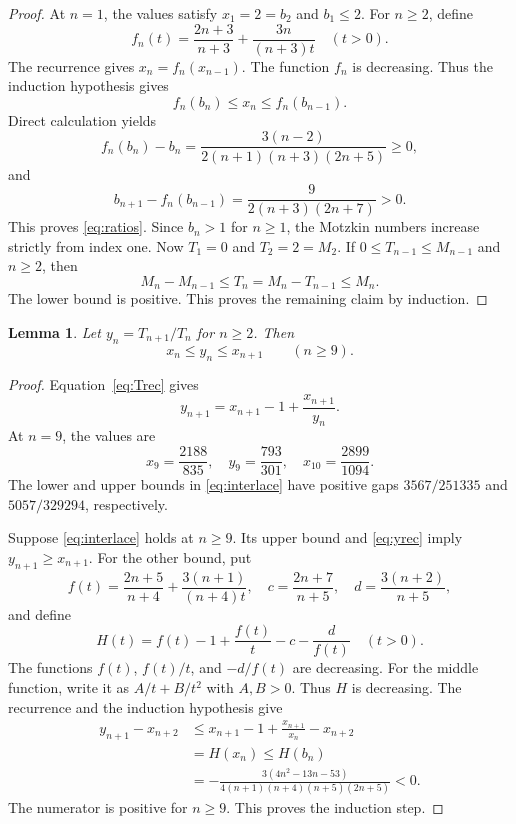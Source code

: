 \documentclass[11pt]{article}
\newtheorem{lemma}[theorem]{Lemma}
\begin{document}
\begin{proof}
At $n=1$, the values satisfy $x_1=2=b_2$ and $b_1\le2$.
For $n\ge2$, define
\[
f_n(t)=\frac{2n+3}{n+3}+\frac{3n}{(n+3)t}\quad(t>0).
\]
The recurrence gives $x_n=f_n(x_{n-1})$.
The function $f_n$ is decreasing. Thus the induction hypothesis gives
\[
f_n(b_n)\le x_n\le f_n(b_{n-1}).
\]
Direct calculation yields
\[
f_n(b_n)-b_n
=\frac{3(n-2)}{2(n+1)(n+3)(2n+5)}\ge0,
\]
and
\[
b_{n+1}-f_n(b_{n-1})
=\frac{9}{2(n+3)(2n+7)}>0.
\]
This proves \eqref{eq:ratios}.
Since $b_n>1$ for $n\ge1$, the Motzkin numbers increase strictly from
index one. Now $T_1=0$ and $T_2=2=M_2$.
If $0\le T_{n-1}\le M_{n-1}$ and $n\ge2$, then
\[
M_n-M_{n-1}\le T_n=M_n-T_{n-1}\le M_n.
\]
The lower bound is positive. This proves the remaining claim by induction.
\end{proof}

\begin{lemma}\label{lem:interlace}
Let $y_n=T_{n+1}/T_n$ for $n\ge2$. Then
\begin{equation}\label{eq:interlace}
x_n\le y_n\le x_{n+1}\qquad(n\ge9).
\end{equation}
\end{lemma}

\begin{proof}
Equation~\eqref{eq:Trec} gives
\begin{equation}\label{eq:yrec}
y_{n+1}=x_{n+1}-1+\frac{x_{n+1}}{y_n}.
\end{equation}
At $n=9$, the values are
\[
x_9=\frac{2188}{835},\quad y_9=\frac{793}{301},\quad
x_{10}=\frac{2899}{1094}.
\]
The lower and upper bounds in \eqref{eq:interlace} have positive gaps
$3567/251335$ and $5057/329294$, respectively.

Suppose \eqref{eq:interlace} holds at $n\ge9$.
Its upper bound and \eqref{eq:yrec} imply $y_{n+1}\ge x_{n+1}$.
For the other bound, put
\[
f(t)=\frac{2n+5}{n+4}+\frac{3(n+1)}{(n+4)t},\quad
c=\frac{2n+7}{n+5},\quad d=\frac{3(n+2)}{n+5},
\]
and define
\[
H(t)=f(t)-1+\frac{f(t)}t-c-\frac d{f(t)}\quad(t>0).
\]
The functions $f(t)$, $f(t)/t$, and $-d/f(t)$ are decreasing.
For the middle function, write it as $A/t+B/t^2$ with $A,B>0$.
Thus $H$ is decreasing. The recurrence and the induction hypothesis give
\begin{align*}
y_{n+1}-x_{n+2}
&\le x_{n+1}-1+\frac{x_{n+1}}{x_n}-x_{n+2}\\
&=H(x_n)\le H(b_n)\\
&=-\frac{3(4n^2-13n-53)}{4(n+1)(n+4)(n+5)(2n+5)}<0.
\end{align*}
The numerator is positive for $n\ge9$.
This proves the induction step.
\end{proof}
\end{document}
